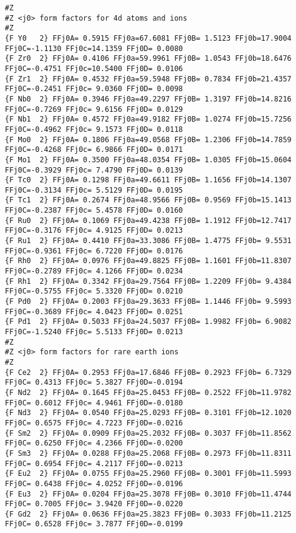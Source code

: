 {\begin{verbatim}
#Z
#Z <j0> form factors for 4d atoms and ions
#Z
{F Y0   2} FFj0A= 0.5915 FFj0a=67.6081 FFj0B= 1.5123 FFj0b=17.9004 FFj0C=-1.1130 FFj0c=14.1359 FFj0D= 0.0080 
{F Zr0  2} FFj0A= 0.4106 FFj0a=59.9961 FFj0B= 1.0543 FFj0b=18.6476 FFj0C=-0.4751 FFj0c=10.5400 FFj0D= 0.0106 
{F Zr1  2} FFj0A= 0.4532 FFj0a=59.5948 FFj0B= 0.7834 FFj0b=21.4357 FFj0C=-0.2451 FFj0c= 9.0360 FFj0D= 0.0098 
{F Nb0  2} FFj0A= 0.3946 FFj0a=49.2297 FFj0B= 1.3197 FFj0b=14.8216 FFj0C=-0.7269 FFj0c= 9.6156 FFj0D= 0.0129 
{F Nb1  2} FFj0A= 0.4572 FFj0a=49.9182 FFj0B= 1.0274 FFj0b=15.7256 FFj0C=-0.4962 FFj0c= 9.1573 FFj0D= 0.0118 
{F Mo0  2} FFj0A= 0.1806 FFj0a=49.0568 FFj0B= 1.2306 FFj0b=14.7859 FFj0C=-0.4268 FFj0c= 6.9866 FFj0D= 0.0171 
{F Mo1  2} FFj0A= 0.3500 FFj0a=48.0354 FFj0B= 1.0305 FFj0b=15.0604 FFj0C=-0.3929 FFj0c= 7.4790 FFj0D= 0.0139 
{F Tc0  2} FFj0A= 0.1298 FFj0a=49.6611 FFj0B= 1.1656 FFj0b=14.1307 FFj0C=-0.3134 FFj0c= 5.5129 FFj0D= 0.0195 
{F Tc1  2} FFj0A= 0.2674 FFj0a=48.9566 FFj0B= 0.9569 FFj0b=15.1413 FFj0C=-0.2387 FFj0c= 5.4578 FFj0D= 0.0160 
{F Ru0  2} FFj0A= 0.1069 FFj0a=49.4238 FFj0B= 1.1912 FFj0b=12.7417 FFj0C=-0.3176 FFj0c= 4.9125 FFj0D= 0.0213 
{F Ru1  2} FFj0A= 0.4410 FFj0a=33.3086 FFj0B= 1.4775 FFj0b= 9.5531 FFj0C=-0.9361 FFj0c= 6.7220 FFj0D= 0.0176 
{F Rh0  2} FFj0A= 0.0976 FFj0a=49.8825 FFj0B= 1.1601 FFj0b=11.8307 FFj0C=-0.2789 FFj0c= 4.1266 FFj0D= 0.0234 
{F Rh1  2} FFj0A= 0.3342 FFj0a=29.7564 FFj0B= 1.2209 FFj0b= 9.4384 FFj0C=-0.5755 FFj0c= 5.3320 FFj0D= 0.0210 
{F Pd0  2} FFj0A= 0.2003 FFj0a=29.3633 FFj0B= 1.1446 FFj0b= 9.5993 FFj0C=-0.3689 FFj0c= 4.0423 FFj0D= 0.0251 
{F Pd1  2} FFj0A= 0.5033 FFj0a=24.5037 FFj0B= 1.9982 FFj0b= 6.9082 FFj0C=-1.5240 FFj0c= 5.5133 FFj0D= 0.0213 
#Z
#Z <j0> form factors for rare earth ions
#Z
{F Ce2  2} FFj0A= 0.2953 FFj0a=17.6846 FFj0B= 0.2923 FFj0b= 6.7329 FFj0C= 0.4313 FFj0c= 5.3827 FFj0D=-0.0194 
{F Nd2  2} FFj0A= 0.1645 FFj0a=25.0453 FFj0B= 0.2522 FFj0b=11.9782 FFj0C= 0.6012 FFj0c= 4.9461 FFj0D=-0.0180 
{F Nd3  2} FFj0A= 0.0540 FFj0a=25.0293 FFj0B= 0.3101 FFj0b=12.1020 FFj0C= 0.6575 FFj0c= 4.7223 FFj0D=-0.0216 
{F Sm2  2} FFj0A= 0.0909 FFj0a=25.2032 FFj0B= 0.3037 FFj0b=11.8562 FFj0C= 0.6250 FFj0c= 4.2366 FFj0D=-0.0200 
{F Sm3  2} FFj0A= 0.0288 FFj0a=25.2068 FFj0B= 0.2973 FFj0b=11.8311 FFj0C= 0.6954 FFj0c= 4.2117 FFj0D=-0.0213 
{F Eu2  2} FFj0A= 0.0755 FFj0a=25.2960 FFj0B= 0.3001 FFj0b=11.5993 FFj0C= 0.6438 FFj0c= 4.0252 FFj0D=-0.0196 
{F Eu3  2} FFj0A= 0.0204 FFj0a=25.3078 FFj0B= 0.3010 FFj0b=11.4744 FFj0C= 0.7005 FFj0c= 3.9420 FFj0D=-0.0220 
{F Gd2  2} FFj0A= 0.0636 FFj0a=25.3823 FFj0B= 0.3033 FFj0b=11.2125 FFj0C= 0.6528 FFj0c= 3.7877 FFj0D=-0.0199 

\end{verbatim}}
